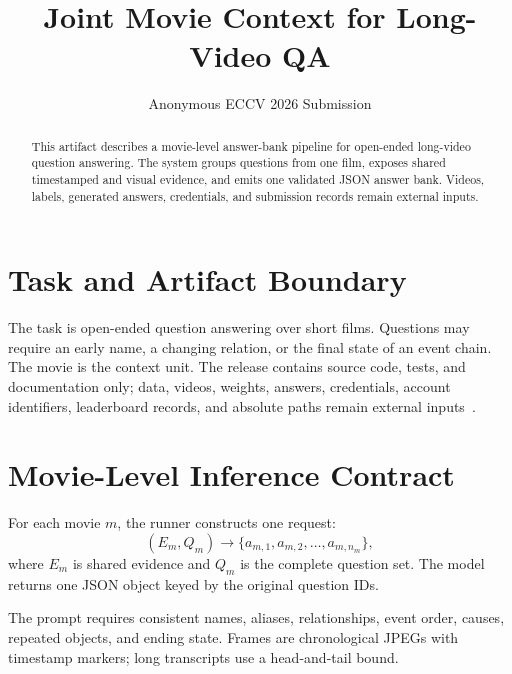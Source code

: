 \documentclass[runningheads]{llncs}
\begin{document}
\title{Joint Movie Context for Long-Video QA}
\author{Anonymous ECCV 2026 Submission}
\maketitle

\begin{abstract}
This artifact describes a movie-level answer-bank pipeline for open-ended long-video question answering. The system groups questions from one film, exposes shared timestamped and visual evidence, and emits one validated JSON answer bank. Videos, labels, generated answers, credentials, and submission records remain external inputs.
\end{abstract}

\section{Task and Artifact Boundary}

The task is open-ended question answering over short films. Questions may
require an early name, a changing relation, or the final state of an event
chain. The movie is the context unit. The release contains source code, tests,
and documentation only; data, videos, weights, answers, credentials, account
identifiers, leaderboard records, and absolute paths remain external
inputs~\cite{sf20kdata2026,slomo2026}.

\section{Movie-Level Inference Contract}

For each movie $m$, the runner constructs one request:
\begin{equation}
  (E_m,Q_m) \longrightarrow \{a_{m,1},a_{m,2},\ldots,a_{m,n_m}\},
\end{equation}
where $E_m$ is shared evidence and $Q_m$ is the complete question set. The
model returns one JSON object keyed by the original question IDs.

The prompt requires consistent names, aliases, relationships, event order,
causes, repeated objects, and ending state. Frames are chronological JPEGs with
timestamp markers; long transcripts use a head-and-tail bound.
\end{document}
